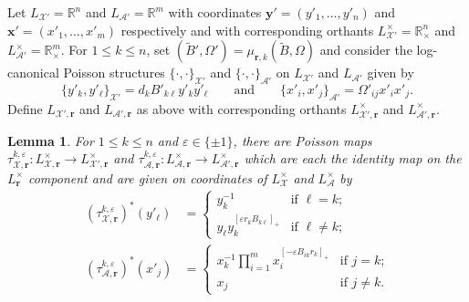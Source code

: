 \documentclass{amsart}
\newtheorem{lemma}[theorem]{Lemma}
\numberwithin{equation}{section}
\newcommand{\bfr}{{\boldsymbol{r}}}
\newcommand{\bfx}{{\boldsymbol{x}}}
\newcommand{\bfy}{{\boldsymbol{y}}}
\newcommand{\cA}{\mathcal{A}}
\newcommand{\cX}{\mathcal{X}}
\newcommand{\RR}{\mathbb{R}}
\begin{document}
Let $L_{\cX'}=\RR^n$ and $L_{\cA'}=\RR^m$ with coordinates $\bfy'=(y'_1,\ldots,y'_n)$ and $\bfx'=(x'_1,\ldots,x'_m)$ respectively and with corresponding orthants $L^\times_{\cX'}=\RR_\times^n$ and $L^\times_{\cA'}=\RR_\times^m$.
For $1\le k\le n$, set $(\tilde B',\Omega')=\mu_{\bfr,k}(\tilde B,\Omega)$ and consider the log-canonical Poisson structures $\{\cdot,\cdot\}_{\cX'}$ and $\{\cdot,\cdot\}_{\cA'}$ on $L_{\cX'}$ and $L_{\cA'}$ given by
\begin{equation}
  \label{eq:brackets2}
  \{y'_k,y'_\ell\}_{\cX'}=d_kB'_{k\ell}y'_ky'_\ell\qquad\text{and}\qquad\{x'_i,x'_j\}_{\cA'}=\Omega'_{ij}x'_ix'_j.
\end{equation}
Define $L_{\cX',\bfr}$ and $L_{\cA',\bfr}$ as above with corresponding orthants $L^\times_{\cX',\bfr}$ and $L^\times_{\cA',\bfr}$.
\begin{lemma}
  \label{le:tropical cluster transformations}
  For $1\le k\le n$ and $\varepsilon\in\{\pm1\}$, there are Poisson maps $\tau_{\cX,\bfr}^{k,\varepsilon}:L^\times_{\cX,\bfr}\to L^\times_{\cX',\bfr}$ and $\tau_{\cA,\bfr}^{k,\varepsilon}:L^\times_{\cA,\bfr}\to L^\times_{\cA',\bfr}$ which are each the identity map on the $L_\bfr^\times$ component and are given on coordinates of $L^\times_\cX$ and $L^\times_\cA$ by
  \begin{align}
    \label{eq:tropical X transformation}
    (\tau_{\cX,\bfr}^{k,\varepsilon})^*(y'_\ell)
    &=\begin{cases} 
      y_k^{-1} & \text{if $\ell=k$;}\\ 
      y_\ell y_k^{[\varepsilon r_kB_{k\ell}]_+} & \text{if $\ell\ne k$;}
    \end{cases}\\
    \label{eq:tropical A transformation}
    (\tau_{\cA,\bfr}^{k,\varepsilon})^*(x'_j)
    &=\begin{cases} 
      x_k^{-1}\prod\limits_{i=1}^m x_i^{[-\varepsilon B_{ik}r_k]_+} & \text{if $j=k$;}\\
      x_j & \text{if $j\ne k$.}
    \end{cases}
  \end{align}
\end{lemma}
\end{document}
